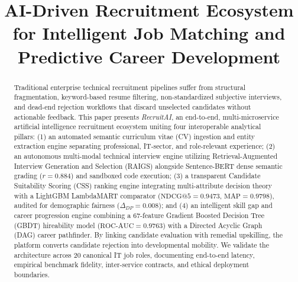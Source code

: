 \documentclass[conference]{IEEEtran}
\begin{document}
\title{AI-Driven Recruitment Ecosystem for Intelligent Job Matching and Predictive Career Development}

\author{
}

\maketitle

\begin{abstract}
Traditional enterprise technical recruitment pipelines suffer from structural fragmentation, keyword-based resume filtering, non-standardized subjective interviews, and dead-end rejection workflows that discard unselected candidates without actionable feedback. This paper presents \textit{RecruitAI}, an end-to-end, multi-microservice artificial intelligence recruitment ecosystem uniting four interoperable analytical pillars: (1) an automated semantic curriculum vitae (CV) ingestion and entity extraction engine separating professional, IT-sector, and role-relevant experience; (2) an autonomous multi-modal technical interview engine utilizing Retrieval-Augmented Interview Generation and Selection (RAIGS) alongside Sentence-BERT dense semantic grading ($r=0.884$) and sandboxed code execution; (3) a transparent Candidate Suitability Scoring (CSS) ranking engine integrating multi-attribute decision theory with a LightGBM LambdaMART comparator ($\text{NDCG@5}=0.9473$, $\text{MAP}=0.9798$), audited for demographic fairness ($\Delta_{DP}=0.008$); and (4) an intelligent skill gap and career progression engine combining a 67-feature Gradient Boosted Decision Tree (GBDT) hireability model ($\text{ROC-AUC}=0.9763$) with a Directed Acyclic Graph (DAG) career pathfinder. By linking candidate evaluation with remedial upskilling, the platform converts candidate rejection into developmental mobility. We validate the architecture across 20 canonical IT job roles, documenting end-to-end latency, empirical benchmark fidelity, inter-service contracts, and ethical deployment boundaries.
\end{abstract}
\end{document}
